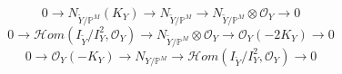 \documentclass[11pt,twoside]{amsart}
\theoremstyle{plain}
\numberwithin{equation}{section}
\newtheorem{theorem}{Theorem}[section]
\theoremstyle{definition}
\begin{document}
\begin{equation}
    0 \to N_{\widetilde{Y}/\mathbb{P}^M} (K_Y) \to N_{\widetilde{Y}/\mathbb{P}^M} \to N_{\widetilde{Y}/\mathbb{P}^M} \otimes \mathcal{O}_Y \to 0
\end{equation}
\begin{equation}
    0 \to \mathcal{H}om(I_{\widetilde{Y}}/I_{Y}^2, \mathcal{O}_Y) \to N_{\widetilde{Y}/\mathbb{P}^M} \otimes \mathcal{O}_Y \to \mathcal{O}_Y(-2K_Y) \to 0 
\end{equation}
\begin{equation}
    0 \to \mathcal{O}_Y(-K_Y) \to N_{Y/\mathbb{P}^M} \to \mathcal{H}om(I_{\widetilde{Y}}/I_{Y}^2, \mathcal{O}_Y) \to 0
\end{equation}




\end{document}
